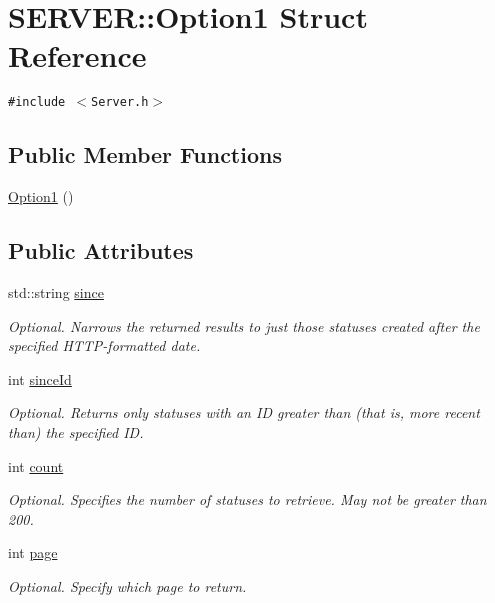 \hypertarget{structSERVER_1_1Option1}{
\section{SERVER::Option1 Struct Reference}
\label{structSERVER_1_1Option1}
}
{\tt \#include $<$Server.h$>$}

\subsection*{Public Member Functions}
\begin{CompactItemize}
\item 
\hyperlink{structSERVER_1_1Option1_f5c6a93cd6119cec081dab70fcb342d6}{Option1} ()
\end{CompactItemize}
\subsection*{Public Attributes}
\begin{CompactItemize}
\item 
std::string \hyperlink{structSERVER_1_1Option1_ab0f16c33d1a47822ab2622f1a8e03b4}{since}
\begin{CompactList}\small\item\em Optional. Narrows the returned results to just those statuses created after the specified HTTP-formatted date. \item\end{CompactList}\item 
int \hyperlink{structSERVER_1_1Option1_30def1c303684fd431b3cb2d78fbe18d}{sinceId}
\begin{CompactList}\small\item\em Optional. Returns only statuses with an ID greater than (that is, more recent than) the specified ID. \item\end{CompactList}\item 
int \hyperlink{structSERVER_1_1Option1_20b51548aa06990c9e1f5b5fd8d878e5}{count}
\begin{CompactList}\small\item\em Optional. Specifies the number of statuses to retrieve. May not be greater than 200. \item\end{CompactList}\item 
int \hyperlink{structSERVER_1_1Option1_00eb077ba9bbe459a38aea89f1c71426}{page}
\begin{CompactList}\small\item\em Optional. Specify which page to return. \item\end{CompactList}\end{CompactItemize}


